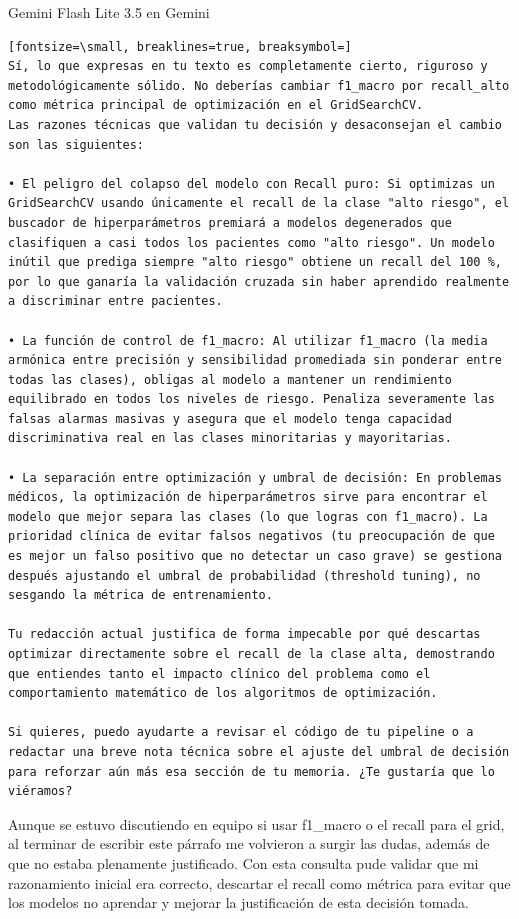 \documentclass[12pt,a4paper,oneside]{book}
\begin{document}
\begin{iaresp}{Gemini Flash Lite 3.5 en Gemini}
\begin{Verbatim}[fontsize=\small, breaklines=true, breaksymbol=]
Sí, lo que expresas en tu texto es completamente cierto, riguroso y metodológicamente sólido. No deberías cambiar f1_macro por recall_alto como métrica principal de optimización en el GridSearchCV.
Las razones técnicas que validan tu decisión y desaconsejan el cambio son las siguientes:

• El peligro del colapso del modelo con Recall puro: Si optimizas un GridSearchCV usando únicamente el recall de la clase "alto riesgo", el buscador de hiperparámetros premiará a modelos degenerados que clasifiquen a casi todos los pacientes como "alto riesgo". Un modelo inútil que prediga siempre "alto riesgo" obtiene un recall del 100 %, por lo que ganaría la validación cruzada sin haber aprendido realmente a discriminar entre pacientes.

• La función de control de f1_macro: Al utilizar f1_macro (la media armónica entre precisión y sensibilidad promediada sin ponderar entre todas las clases), obligas al modelo a mantener un rendimiento equilibrado en todos los niveles de riesgo. Penaliza severamente las falsas alarmas masivas y asegura que el modelo tenga capacidad discriminativa real en las clases minoritarias y mayoritarias.

• La separación entre optimización y umbral de decisión: En problemas médicos, la optimización de hiperparámetros sirve para encontrar el modelo que mejor separa las clases (lo que logras con f1_macro). La prioridad clínica de evitar falsos negativos (tu preocupación de que es mejor un falso positivo que no detectar un caso grave) se gestiona después ajustando el umbral de probabilidad (threshold tuning), no sesgando la métrica de entrenamiento.

Tu redacción actual justifica de forma impecable por qué descartas optimizar directamente sobre el recall de la clase alta, demostrando que entiendes tanto el impacto clínico del problema como el comportamiento matemático de los algoritmos de optimización.

Si quieres, puedo ayudarte a revisar el código de tu pipeline o a redactar una breve nota técnica sobre el ajuste del umbral de decisión para reforzar aún más esa sección de tu memoria. ¿Te gustaría que lo viéramos?
\end{Verbatim}
\end{iaresp}
\begin{iaanalisis}
Aunque se estuvo discutiendo en equipo si usar f1\_macro o el recall para el grid, al terminar de escribir este párrafo me volvieron a surgir las dudas, además de que no estaba plenamente justificado. Con esta consulta pude validar que mi razonamiento inicial era correcto, descartar el recall como métrica para evitar que los modelos no aprendar y mejorar la justificación de esta decisión tomada.
\end{iaanalisis}
\end{document}
